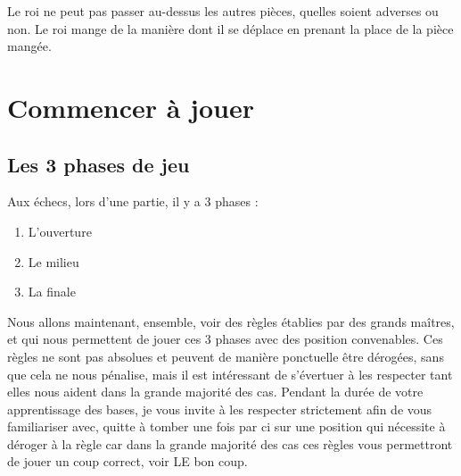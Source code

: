 \documentclass[a5paper,openany,twocolumn]{book}
\begin{document}
{Le roi ne peut pas passer au-dessus les autres pièces, quelles soient adverses ou non. Le roi mange de la manière dont il se déplace en prenant la place de la pièce mangée. 


\onecolumn

\newpage \thispagestyle{empty}
\strut
\newpage \thispagestyle{empty}

\twocolumn

\part{Commencer à jouer}

\onecolumn

\newpage \thispagestyle{empty}
\strut
\newpage \thispagestyle{empty}

\twocolumn

\setcounter{chapter}{0}

\chapter{Les 3 phases de jeu}

Aux échecs, lors d'une partie, il y a 3 phases :

\begin{enumerate}

\item{L'ouverture}

\item{Le milieu}

\item{La finale}

\end{enumerate}

Nous allons maintenant, ensemble, voir des règles établies par des grands maîtres, et qui nous permettent de jouer ces 3 phases avec des position convenables. Ces règles ne sont pas absolues et peuvent de manière ponctuelle être dérogées, sans que cela ne nous pénalise, mais il est intéressant de s’évertuer à les respecter tant elles nous aident dans la grande majorité des cas. Pendant la durée de votre apprentissage des bases, je vous invite à les respecter strictement afin de vous familiariser avec, quitte à tomber une fois par ci sur une position qui nécessite à déroger à la règle car dans la grande majorité des cas ces règles vous permettront de jouer un coup correct, voir LE bon coup.

}
\end{document}
